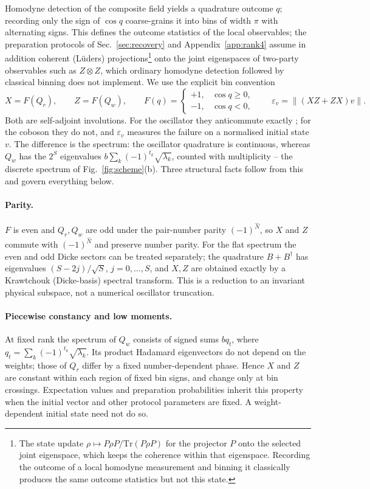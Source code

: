 \documentclass[11pt,a4paper]{article}
\begin{document}
Homodyne detection of the composite field yields a quadrature outcome $q$; recording only the sign of $\cos q$ coarse-grains it into bins of width $\pi$ with alternating signs. This defines the outcome statistics of the local observables; the preparation protocols of Sec.~\ref{sec:recovery} and Appendix~\ref{app:rank4} assume in addition coherent (L\"uders) projections\footnote{The state update $\rho\mapsto P\rho P/\mathrm{Tr}(P\rho P)$ for the projector $P$ onto the selected joint eigenspace, which keeps the coherence within that eigenspace. Recording the outcome of a local homodyne measurement and binning it classically produces the same outcome statistics but not this state.} onto the joint eigenspaces of two-party observables such as $Z\otimes Z$, which ordinary homodyne detection followed by classical binning does not implement. We use the explicit bin convention
\begin{equation}
X=F(Q_r),\qquad Z=F(Q_w),\qquad F(q)=\begin{cases}+1,&\cos q\ge0,\\-1,&\cos q<0,\end{cases}\qquad
\varepsilon_v=\|(XZ+ZX)v\| .
\label{eq:bins}
\end{equation}
Both are self-adjoint involutions. For the oscillator they anticommute exactly \cite{Sorella2026}; for the coboson they do not, and $\varepsilon_v$ measures the failure on a normalised initial state $v$. The difference is the spectrum: the oscillator quadrature is continuous, whereas $Q_w$ has the $2^S$ eigenvalues $b\sum_k(-1)^{t_k}\sqrt{\lambda_k}$, counted with multiplicity -- the discrete spectrum of Fig.~\ref{fig:scheme}(b). Three structural facts follow from this and govern everything below.

\paragraph{Parity.}
$F$ is even and $Q_r,Q_w$ are odd under the pair-number parity $(-1)^{\hat N}$, so $X$ and $Z$ commute with $(-1)^{\hat N}$ and preserve number parity. For the flat spectrum the even and odd Dicke sectors can be treated separately; the quadrature $B+B^\dagger$ has eigenvalues $(S-2j)/\sqrt S$, $j=0,\dots,S$, and $X,Z$ are obtained exactly by a Krawtchouk (Dicke-basis) spectral transform. This is a reduction to an invariant physical subspace, not a numerical oscillator truncation.

\paragraph{Piecewise constancy and low moments.}
At fixed rank the spectrum of $Q_w$ consists of signed sums $bq_t$, where $q_t=\sum_k(-1)^{t_k}\sqrt{\lambda_k}$. Its product Hadamard eigenvectors do not depend on the weights; those of $Q_r$ differ by a fixed number-dependent phase. Hence $X$ and $Z$ are constant within each region of fixed bin signs, and change only at bin crossings. Expectation values and preparation probabilities inherit this property when the initial vector and other protocol parameters are fixed. A weight-dependent initial state need not do so.
\end{document}
